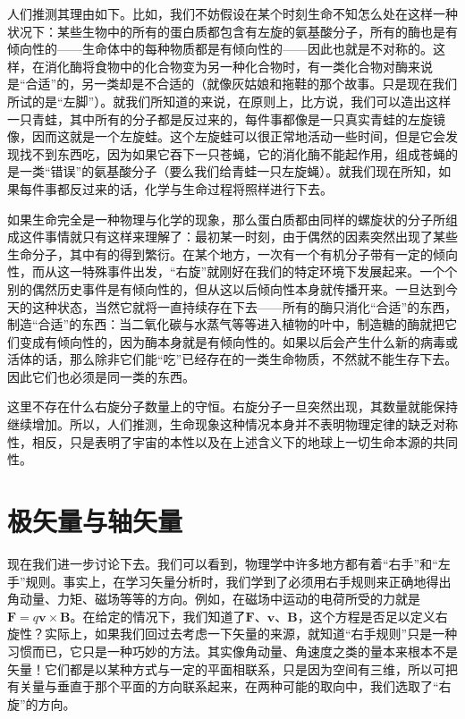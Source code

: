 人们推测其理由如下。比如，我们不妨假设在某个时刻生命不知怎么处在这样一种状况下：某些生物中的所有的蛋白质都包含有左旋的氨基酸分子，所有的酶也是有倾向性的——生命体中的每种物质都是有倾向性的——因此也就是不对称的。这样，在消化酶将食物中的化合物变为另一种化合物时，有一类化合物对酶来说是“合适”的，另一类却是不合适的（就像灰姑娘和拖鞋的那个故事。只是现在我们所试的是“左脚”）。就我们所知道的来说，在原则上，比方说，我们可以造出这样一只青蛙，其中所有的分子都是反过来的，每件事都像是一只真实青蛙的左旋镜像，因而这就是一个左旋蛙。这个左旋蛙可以很正常地活动一些时间，但是它会发现找不到东西吃，因为如果它吞下一只苍蝇，它的消化酶不能起作用，组成苍蝇的是一类“错误”的氨基酸分子（要么我们给青蛙一只左旋蝇）。就我们现在所知，如果每件事都反过来的话，化学与生命过程将照样进行下去。

如果生命完全是一种物理与化学的现象，那么蛋白质都由同样的螺旋状的分子所组成这件事情就只有这样来理解了：最初某一时刻，由于偶然的因素突然出现了某些生命分子，其中有的得到繁衍。在某个地方，一次有一个有机分子带有一定的倾向性，而从这一特殊事件出发，“右旋”就刚好在我们的特定环境下发展起来。一个个别的偶然历史事件是有倾向性的，但从这以后倾向性本身就传播开来。一旦达到今天的这种状态，当然它就将一直持续存在下去——所有的酶只消化“合适”的东西，制造“合适”的东西：当二氧化碳与水蒸气等等进入植物的叶中，制造糖的酶就把它们变成有倾向性的，因为酶本身就是有倾向性的。如果以后会产生什么新的病毒或活体的话，那么除非它们能“吃”已经存在的一类生命物质，不然就不能生存下去。因此它们也必须是同一类的东西。

这里不存在什么右旋分子数量上的守恒。右旋分子一旦突然出现，其数量就能保持继续增加。所以，人们推测，生命现象这种情况本身并不表明物理定律的缺乏对称性，相反，只是表明了宇宙的本性以及在上述含义下的地球上一切生命本源的共同性。

\section{极矢量与轴矢量}

现在我们进一步讨论下去。我们可以看到，物理学中许多地方都有着“右手”和“左手”规则。事实上，在学习矢量分析时，我们学到了必须用右手规则来正确地得出角动量、力矩、磁场等等的方向。例如，在磁场中运动的电荷所受的力就是$\boldsymbol{F} = q\boldsymbol{v}\times\boldsymbol{B}$。在给定的情况下，我们知道了$\boldsymbol{F}$、$\boldsymbol{v}$、$\boldsymbol{B}$，这个方程是否足以定义右旋性？实际上，如果我们回过去考虑一下矢量的来源，就知道“右手规则”只是一种习惯而已，它只是一种巧妙的方法。其实像角动量、角速度之类的量本来根本不是矢量！它们都是以某种方式与一定的平面相联系，只是因为空间有三维，所以可把有关量与垂直于那个平面的方向联系起来，在两种可能的取向中，我们选取了“右旋”的方向。

